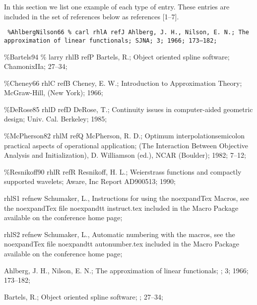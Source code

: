 In this section we list one example of each type of entry.
These entries are included in the set of references
below as references [1--7].

{\obeylines \tt
\ms
\%AhlbergNilson66
\% carl
\back{}rhl\lb{}A\rb{}
\back{}refJ Ahlberg,  J. H., Nilson, E. N.;
The approximation of linear functionals;
\back{}SJNA; 3; 1966; 173--182;
\ms

\%Bartels94
\% larry
\back{}rhl\lb{}B\rb{}
\back{}refP Bartels, R.;
Object oriented spline software;
\back{}ChamonixIIa; 27--34;
\ms

\%Cheney66
\back{}rhl\lb{}C\rb{}
\back{}refB Cheney,  E. W.;
Introduction to Approximation Theory;
McGraw-Hill, (New York); 1966;
\ms

\%DeRose85
\back{}rhl\lb{}D\rb{}
\back{}refD DeRose,  T.;
Continuity issues in computer-aided geometric design;
Univ. Cal. Berkeley; 1985;
\ms

\%McPherson82
\back{}rhl\lb{}M\rb{}
\back{}refQ McPherson,	R. D.;
Optimum interpolation\back{}semicolon practical aspects of
operational application;
(The Interaction Between Objective Analysis
and Initialization),
D. Williamson (ed.),  NCAR (Boulder); 1982; 7--12;
\ms

\%Resnikoff90
\back{}rhl\lb{}R\rb{}
\back{}refR Resnikoff,	H. L.;
Weierstrass functions and compactly supported wavelets;
Aware, Inc Report AD900513; 1990;
\ms

\back{}rhl\lb{}S1\rb{}
\back{}refnew Schumaker, L.,
Instructions for using the \conf \back{}noexpand\back{}Tex Macros,
see the \back{}noexpand\back{}Tex file
\lb{}\back{}noexpand\back{}tt instruct.tex\rb{} included in the
\conf{}Macro Package available on the conference
home page;
\ms

\back{}rhl\lb{}S2\rb{}
\back{}refnew Schumaker, L.,
Automatic numbering with the \conf macros,
see the \back{}noexpand\back{}Tex file
\lb{}\back{}noexpand\back{}tt autonumber.tex\rb{} included in the
\conf{}Macro Package available on the conference
home page;
\ms
}



\References
\startbib

 Ahlberg,	J. H., Nilson, E. N.;
The approximation of linear functionals;
\SJNA; 3; 1966; 173--182;

 Bartels, R.;
Object oriented spline software;
\ChamonixIIa; 27--34;


